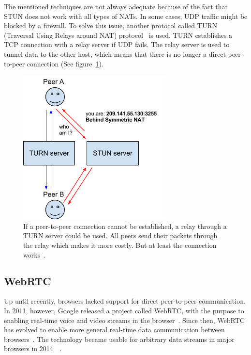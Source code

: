 The mentioned techniques are not always adequate because of the fact that STUN does not work with all types of NATs. In some cases, UDP traffic might be blocked by a firewall. To solve this issue, another protocol called TURN (Traversal Using Relays around NAT) protocol~\cite{RFC5766:Online} is used. TURN establishes a TCP connection with a relay server if UDP fails. The relay server is used to tunnel data to the other host, which means that there is no longer a direct peer-to-peer connection (See figure~\ref{fig:WebRTC - TURN}).

\begin{figure}[htp]
\centering
\includegraphics[width=\textwidth,height=0.2\paperheight,keepaspectratio
]{figures/webrtc-turn}
\caption{If a peer-to-peer connection cannot be established, a relay through a TURN server could be used. All peers send their packets through the relay which makes it more costly. But at least the connection works~\cite{WebRTCArchitecture:2014:Online}.}
\label{fig:WebRTC - TURN}
\end{figure}

\subsection{WebRTC}

Up until recently, browsers lacked support for direct peer-to-peer communication. In 2011, however, Google released a project called WebRTC, with the purpose to enabling real-time voice and video streams in the browser~\cite{WebRTCMemo:Online}. Since then, WebRTC has evolved to enable more general real-time data communication between browsers~\cite{WebRTC:Online}. The technology became usable for arbitrary data streams in major browsers in 2014~\cite{WebRTCChrome:Online}~\cite{WebRTCFirefox:Online}.

